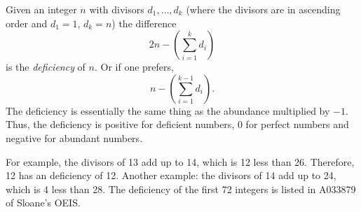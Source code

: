 \documentclass[12pt]{article}
\begin{document}
Given an integer $n$ with divisors $d_1, \ldots , d_k$ (where the divisors are in ascending order and $d_1 = 1$, $d_k = n$) the difference $$2n - \left( \sum_{i = 1}^k d_i \right)$$ is the {\em deficiency} of $n$. Or if one prefers, $$n - \left( \sum_{i = 1}^{k - 1} d_i \right).$$ The deficiency is essentially the same thing as the abundance multiplied by $-1$. Thus, the deficiency is positive for deficient numbers, 0 for perfect numbers and negative for abundant numbers.

For example, the divisors of 13 add up to 14, which is 12 less than 26. Therefore, 12 has an deficiency of 12. Another example: the divisors of 14 add up to 24, which is 4 less than 28. The deficiency of the first 72 integers is listed in A033879 of Sloane's OEIS.
\end{document}
